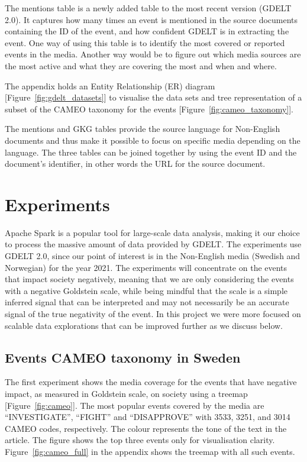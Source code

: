\documentclass[a4, 11pt]{article}
\begin{document}
 The mentions table is a newly added table to the most recent version (GDELT 2.0). 
 It captures how many times an event is mentioned in the source documents containing the ID
 of the event,
 and how confident GDELT is in extracting the event. One way of using this table is to identify 
 the most covered or reported events in the media. Another way would be to figure out which media
 sources are the most active and what they are covering the most and when and where.

 The appendix holds an Entity Relationship (ER) 
 diagram [Figure~\ref{fig:gdelt_datasets}] to
 visualise the data sets and tree representation of a subset of the CAMEO
 taxonomy for the events [Figure~\ref{fig:cameo_taxonomy}].

 The mentions and GKG tables provide the source language for Non-English
 documents and thus make it possible to focus on specific media depending on the
 language. The three tables can be joined together by using the event ID and the
 document's identifier, in other words the URL for the source document.

 \section{Experiments}

 Apache Spark \cite{Spark} is a popular tool for large-scale data analysis, making it our
 choice to process the massive amount of data provided by GDELT. The experiments
 use GDELT 2.0, since our point of interest is in the Non-English media (Swedish
 and Norwegian) for the year 2021. The experiments will concentrate on the
 events that impact society negatively, meaning that we are only considering the
 events with a negative Goldstein scale, while being mindful that the scale is a simple inferred signal that can be interpreted and may not necessarily be an accurate signal of the true negativity of the event. In this project we were more focused on scalable data explorations that can be improved further as we discuss below. 

 \subsection{Events CAMEO taxonomy in Sweden}

 The first experiment shows the media coverage for the events that have negative
 impact, as measured in Goldstein scale, on society using a treemap [Figure~\ref{fig:cameo}]. 
 The most popular events covered by the
 media are ``INVESTIGATE'', ``FIGHT'' and ``DISAPPROVE'' with  3533, 3251, and
 3014 CAMEO codes, respectively. The colour represents the tone of the text in the
 article. The figure shows the top three events only for visualisation clarity.
 Figure~\ref{fig:cameo_full} in the appendix shows the treemap with all such
 events.
\end{document}
